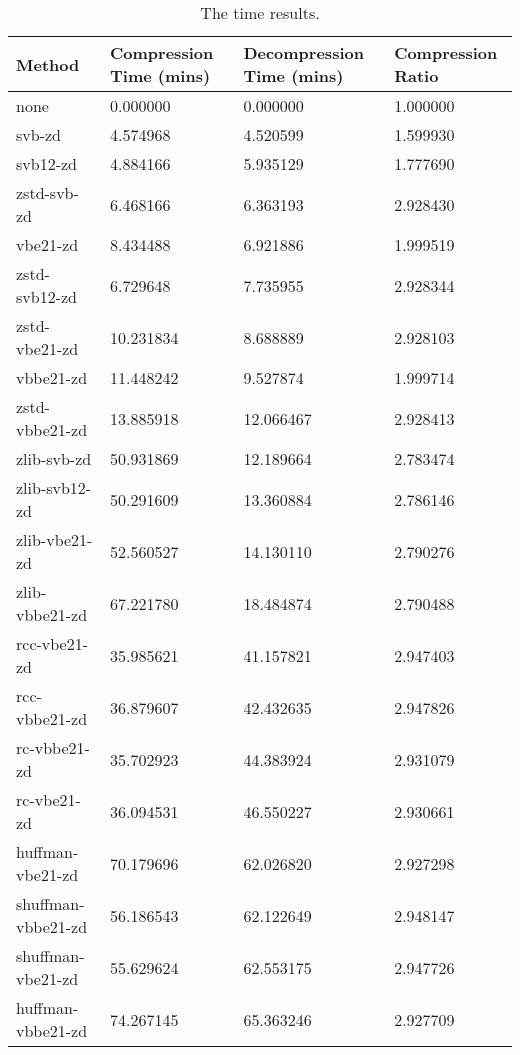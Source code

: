 \begin{table}
    \caption{\label{tab:results-time-dec} The time results.}
	\begin{tabular}{|l|l|l|l|}
	    \hline
	    Method & Compression Time (mins) & Decompression Time (mins) & Compression Ratio \\
\hline
                none    &   0.000000     &    0.000000  & 1.000000\\
              svb-zd    &   4.574968     &    4.520599  & 1.599930\\
            svb12-zd    &   4.884166     &    5.935129  & 1.777690\\
         zstd-svb-zd    &   6.468166     &    6.363193  & 2.928430\\
            vbe21-zd    &   8.434488     &    6.921886  & 1.999519\\
       zstd-svb12-zd    &   6.729648     &    7.735955  & 2.928344\\
       zstd-vbe21-zd    &  10.231834     &    8.688889  & 2.928103\\
           vbbe21-zd    &  11.448242     &    9.527874  & 1.999714\\
      zstd-vbbe21-zd    &  13.885918     &   12.066467  & 2.928413\\
         zlib-svb-zd    &  50.931869     &   12.189664  & 2.783474\\
       zlib-svb12-zd    &  50.291609     &   13.360884  & 2.786146\\
       zlib-vbe21-zd    &  52.560527     &   14.130110  & 2.790276\\
      zlib-vbbe21-zd    &  67.221780     &   18.484874  & 2.790488\\
        rcc-vbe21-zd    &  35.985621     &   41.157821  & 2.947403\\
       rcc-vbbe21-zd    &  36.879607     &   42.432635  & 2.947826\\
        rc-vbbe21-zd    &  35.702923     &   44.383924  & 2.931079\\
         rc-vbe21-zd    &  36.094531     &   46.550227  & 2.930661\\
    huffman-vbe21-zd    &  70.179696     &   62.026820  & 2.927298\\
  shuffman-vbbe21-zd    &  56.186543     &   62.122649  & 2.948147\\
   shuffman-vbe21-zd    &  55.629624     &   62.553175  & 2.947726\\
   huffman-vbbe21-zd    &  74.267145     &   65.363246  & 2.927709\\

\end{tabular}
\end{table}
